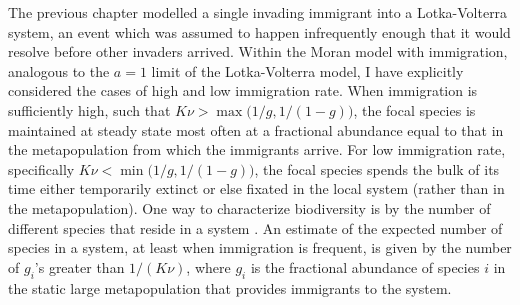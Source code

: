 The previous chapter modelled a single invading immigrant into a Lotka-Volterra system, an event which was assumed to happen infrequently enough that it would resolve before other invaders arrived. 
Within the Moran model with immigration, analogous to the $a=1$ limit of the Lotka-Volterra model, I have explicitly considered the cases of high and low immigration rate. 
When immigration is sufficiently high, such that $K\nu > \max\big(1/g,1/(1-g)\big)$, the focal species is maintained at steady state most often at a fractional abundance equal to that in the metapopulation from which the immigrants arrive. 
For low immigration rate, specifically $K\nu < \min\big(1/g,1/(1-g)\big)$, the focal species spends the bulk of its time either temporarily extinct or else fixated in the local system (rather than in the metapopulation). 
One way to characterize biodiversity is by the number of different species that reside in a system \cite{May1999,Hubbell2001,Chesson2000}. 
An estimate of the expected number of species in a system, at least when immigration is frequent, is given by the number of $g_i$'s greater than $1/(K\nu)$, where $g_i$ is the fractional abundance of species $i$ in the static large metapopulation that provides immigrants to the system. %


